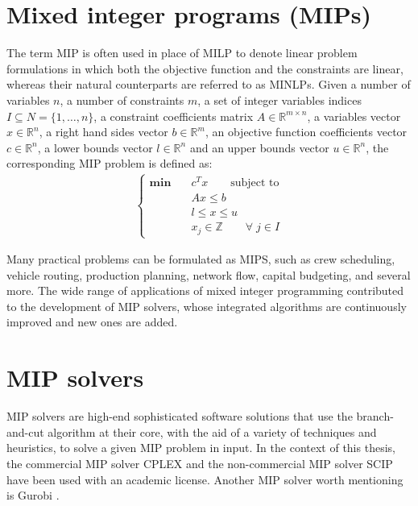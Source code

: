 \documentclass[a4paper,12pt,twoside]{scrbook}
\begin{document}
\section{Mixed integer programs (MIPs)} \label{sec:mip}
The term MIP is often used in place of MILP to denote linear problem formulations in which both the objective function and the constraints are linear, whereas their natural counterparts are referred to as MINLPs.
Given a number of variables $n$, a number of constraints $m$, a set of integer variables indices $I \subseteq N = \{1, \dots, n\}$, a constraint coefficients matrix $A \in \mathbb{R}^{m \times n}$, a variables vector $x \in \mathbb{R}^n$, a right hand sides vector $b \in \mathbb{R}^m$, an objective function coefficients vector $c \in \mathbb{R}^n$, a lower bounds vector $l \in \mathbb{R}^n$ and an upper bounds vector $u \in \mathbb{R}^n$, the corresponding MIP problem is defined as:
\begin{align} \label{eq:mip}
	\begin{cases}
	\textbf{min} \quad & c^Tx \qquad \mbox{subject to} \\
				 & Ax \leq b \\
				 & l \leq x \leq u \\
				 & x_j \in \mathbb{Z} \qquad \forall \; j \in I
	\end{cases}
\end{align}

Many practical problems can be formulated as MIPS, such as crew scheduling, vehicle routing, production planning, network flow, capital budgeting, and several more. The wide range of applications of mixed integer programming contributed to the development of MIP solvers, whose integrated algorithms are continuously improved and new ones are added.

\section{MIP solvers} \label{sec:mipsolvers}
MIP solvers are high-end sophisticated software solutions that use the branch-and-cut algorithm at their core, with the aid of a variety of techniques and heuristics, to solve a given MIP problem in input. In the context of this thesis, the commercial MIP solver CPLEX \cite{cplex} and the non-commercial MIP solver SCIP \cite{scip} have been used with an academic license. Another MIP solver worth mentioning is Gurobi \cite{gurobi}. \par 
\end{document}
